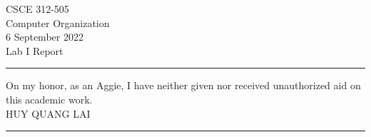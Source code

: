 \documentclass[12pt]{report}
\begin{document}
\begin{center}
{\large
CSCE 312-505\\
Computer Organization \\
6 September 2022 \\
Lab I Report}
\end{center}
\rule{6in}{.1pt}
\begin{center}
{\large
On my honor, as an Aggie, I have neither given nor received unauthorized aid on this academic work.\\
HUY QUANG LAI}
\end{center}
\rule{6in}{.1pt}







\noindent
\end{document}
